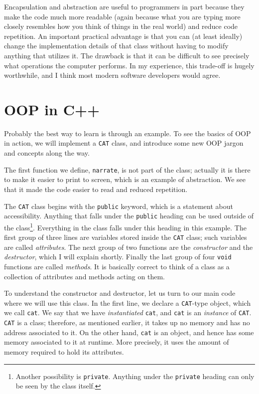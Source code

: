 Encapsulation and abstraction are useful to programmers in part because
they make the code much more readable (again because what you are typing
more closely resembles how you think of things in the real world) and
reduce code repetition. An important practical advantage is that you
can (at least ideally) change the implementation details of that class
without having to modify anything that utilizes it. The drawback is that
it can be difficult to see precisely what operations the computer
performs. In my experience, this trade-off is hugely worthwhile, and I think
most modern software developers would agree.

\section{OOP in C++} 
Probably the best way to learn is through an example. To see the basics
of OOP in action, we will implement a \texttt{CAT} class, and 
introduce some new OOP jargon and concepts along the way.

The first function we define, \texttt{narrate}, is not part of the class;
actually it is there to make it easier to print to screen, which is
an example of abstraction. We see that it made the code easier to
read and reduced repetition.



The \texttt{CAT} class begins with the \texttt{public} keyword, which
is a statement about accessibility. Anything that falls under the
\texttt{public} heading can be used outside of the class\footnote{Another
possibility is \texttt{private}. Anything under the \texttt{private} heading
can only be seen by the class itself.}. Everything in the class falls
under this heading in this example. The first group of three lines
are variables stored inside the \texttt{CAT} class; such variables
are called {\it attributes}. The next group of two functions are
the {\it constructor} and the {\it destructor}, which I will explain
shortly. Finally the last group of four \texttt{void} functions are 
called {\it methods}. It is basically correct to think of a class as a
collection of attributes and methods acting on them. 



To understand the constructor and destructor, let us turn to our main
code where we will use this class. In the first line, we declare a
\texttt{CAT}-type object, which we call \texttt{cat}. We say that we have
{\it instantiated} \texttt{cat}, and \texttt{cat} is an {\it instance}
of \texttt{CAT}. \texttt{CAT} is a class; therefore, as mentioned
earlier, it takes up no memory and has no address associated to it.
On the other hand, \texttt{cat} is an object, and hence has some
memory associated to it at runtime. More precisely, it uses the
amount of memory required to hold its attributes.

